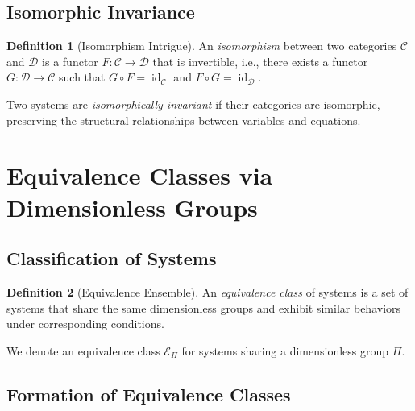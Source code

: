\documentclass{article}
\theoremstyle{definition}
\newtheorem{definition}{Definition}[section]
\theoremstyle{remark}
\begin{document}
	\subsection{Isomorphic Invariance}
	
	\begin{definition}[Isomorphism Intrigue]
		An \emph{isomorphism} between two categories $\mathcal{C}$ and $\mathcal{D}$ is a functor $F: \mathcal{C} \rightarrow \mathcal{D}$ that is invertible, i.e., there exists a functor $G: \mathcal{D} \rightarrow \mathcal{C}$ such that $G \circ F = \operatorname{id}_{\mathcal{C}}$ and $F \circ G = \operatorname{id}_{\mathcal{D}}$.
		
		Two systems are \emph{isomorphically invariant} if their categories are isomorphic, preserving the structural relationships between variables and equations.
	\end{definition}
	
	\section{Equivalence Classes via Dimensionless Groups}
	
	\subsection{Classification of Systems}
	
	\begin{definition}[Equivalence Ensemble]
		An \emph{equivalence class} of systems is a set of systems that share the same dimensionless groups and exhibit similar behaviors under corresponding conditions.
		
		We denote an equivalence class $\mathcal{E}_\Pi$ for systems sharing a dimensionless group $\Pi$.
	\end{definition}
	
	\subsection{Formation of Equivalence Classes}
	
\end{document}
